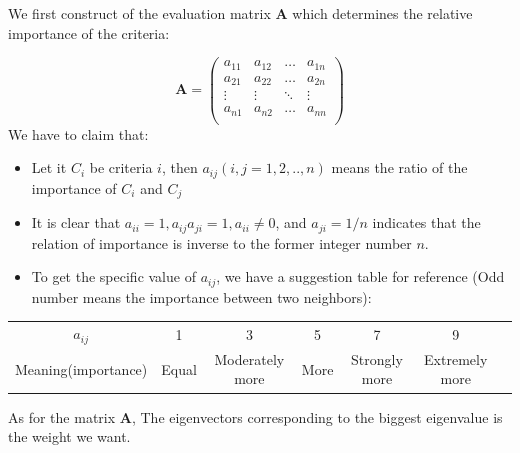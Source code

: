 \documentclass{mcmthesis}
\begin{document}
We first construct of the evaluation matrix $\mathbf{A}$ which determines the relative importance of the criteria:

\[ \mathbf{A} = \left(
\begin{array}{cccc}
a_{11} & a_{12} & \ldots & a_{1n}\\
a_{21} & a_{22} & \ldots & a_{2n}\\
\vdots & \vdots & \ddots & \vdots\\
a_{n1} & a_{n2} & \ldots & a_{nn}\\
\end{array} \right) \]
We have to claim that:
\begin{itemize}
	\item  Let it $C_i$ be criteria $i$, then $a_{ij} (i,j=1,2,..,n)$ means the ratio of the importance of $C_i$ and $C_j$
	\item It is clear that $a_{ii}=1, a_{ij}a_{ji}=1, a_{ii}\ne0$, and $a_{ji}=1/n$ indicates that the relation of importance is inverse to the former integer number $n$.
	\item To get the specific value of $a_{ij}$, we have a suggestion table for reference (Odd number means the importance between two neighbors):%
	\end{itemize}
	\begin{table}[!htbp]
  \small
  \centering
    \begin{tabular}{ccccccc}
    \toprule
    $a_{ij}$ & 1&3&5&7&9\\
    Meaning(importance) &Equal&Moderately more&More&Strongly more&Extremely more\\
   
    \midrule 
    \end{tabular}%
\end{table}%

As for the matrix $\mathbf{A}$, The eigenvectors corresponding to the biggest eigenvalue is the weight we want.
\end{document}
